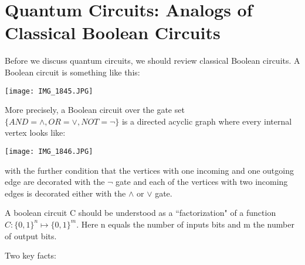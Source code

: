 \documentclass{article}
\begin{document}
\section{Quantum Circuits: Analogs of Classical Boolean Circuits}
Before we discuss quantum circuits, we should review classical Boolean circuits. A Boolean circuit is something like this:

\begin{center}
\texttt{[image: IMG\_1845.JPG]}
\end{center}

More precisely, a Boolean circuit over the gate set $\{AND= \wedge, OR= \vee, NOT=\neg\}$ is a directed acyclic graph where every internal vertex looks like:
\begin{center}
\texttt{[image: IMG\_1846.JPG]}
\end{center}
with the further condition that the vertices with one incoming and one outgoing edge are decorated with the $\neg$ gate and each of the vertices with two incoming edges is decorated either with the $\wedge$ or $\vee$ gate.

A boolean circuit C should be understood as a ``factorization" of a function $C:\{0,1\}^{n} \mapsto \{0,1\}^{m}$. Here n equals the number of inputs bits and m the number of output bits.

Two key facts:
\end{document}
